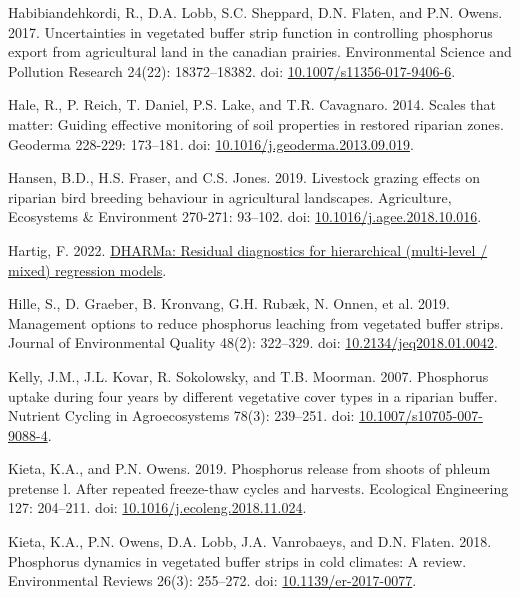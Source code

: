 \documentclass[
]{agujournal2019}
\newlength{\cslhangindent}
\newenvironment{CSLReferences}[2] %
 {\begin{list}{}{%
  \setlength{\itemindent}{0pt}
  \setlength{\leftmargin}{0pt}
  \setlength{\parsep}{0pt}
  \ifodd #1
   \setlength{\leftmargin}{\cslhangindent}
   \setlength{\itemindent}{-1\cslhangindent}
  \fi
  \setlength{\itemsep}{#2\baselineskip}}}
 {\end{list}}
\begin{document}
\begin{CSLReferences}{1}{1}
Habibiandehkordi, R., D.A. Lobb, S.C. Sheppard, D.N. Flaten, and P.N.
Owens. 2017. Uncertainties in vegetated buffer strip function in
controlling phosphorus export from agricultural land in the canadian
prairies. Environmental Science and Pollution Research 24(22):
18372--18382. doi:
\href{https://doi.org/10.1007/s11356-017-9406-6}{10.1007/s11356-017-9406-6}.

Hale, R., P. Reich, T. Daniel, P.S. Lake, and T.R. Cavagnaro. 2014.
Scales that matter: Guiding effective monitoring of soil properties in
restored riparian zones. Geoderma 228-229: 173--181. doi:
\href{https://doi.org/10.1016/j.geoderma.2013.09.019}{10.1016/j.geoderma.2013.09.019}.

Hansen, B.D., H.S. Fraser, and C.S. Jones. 2019. Livestock grazing
effects on riparian bird breeding behaviour in agricultural landscapes.
Agriculture, Ecosystems \& Environment 270-271: 93--102. doi:
\href{https://doi.org/10.1016/j.agee.2018.10.016}{10.1016/j.agee.2018.10.016}.

Hartig, F. 2022.
\href{https://CRAN.R-project.org/package=DHARMa}{DHARMa: Residual
diagnostics for hierarchical (multi-level / mixed) regression models}.

Hille, S., D. Graeber, B. Kronvang, G.H. Rubæk, N. Onnen, et al. 2019.
Management options to reduce phosphorus leaching from vegetated buffer
strips. Journal of Environmental Quality 48(2): 322--329. doi:
\href{https://doi.org/10.2134/jeq2018.01.0042}{10.2134/jeq2018.01.0042}.

Kelly, J.M., J.L. Kovar, R. Sokolowsky, and T.B. Moorman. 2007.
Phosphorus uptake during four years by different vegetative cover types
in a riparian buffer. Nutrient Cycling in Agroecosystems 78(3):
239--251. doi:
\href{https://doi.org/10.1007/s10705-007-9088-4}{10.1007/s10705-007-9088-4}.

Kieta, K.A., and P.N. Owens. 2019. Phosphorus release from shoots of
phleum pretense l. After repeated freeze-thaw cycles and harvests.
Ecological Engineering 127: 204--211. doi:
\href{https://doi.org/10.1016/j.ecoleng.2018.11.024}{10.1016/j.ecoleng.2018.11.024}.

Kieta, K.A., P.N. Owens, D.A. Lobb, J.A. Vanrobaeys, and D.N. Flaten.
2018. Phosphorus dynamics in vegetated buffer strips in cold climates: A
review. Environmental Reviews 26(3): 255--272. doi:
\href{https://doi.org/10.1139/er-2017-0077}{10.1139/er-2017-0077}.


\end{CSLReferences}
\end{document}
